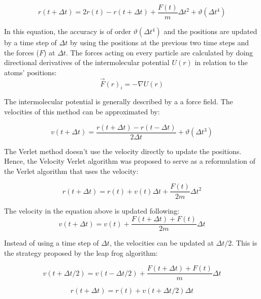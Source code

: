 \begin{equation}
r(t+ \Delta t) = 2r(t) - r(t+ \Delta t) + \frac{F(t)}{m} \Delta t^{2} +\vartheta (\Delta t^{4})
\end{equation}

In this equation, the accuracy is of order $\vartheta (\Delta t^{4})$ and the positions are updated by a time step of $\Delta t$ by using the positions at the previous two time steps and the forces ($F$) at $\Delta t$. The forces  acting on every particle are calculated by doing directional derivatives of the intermolecular potential $U(r)$ in relation to the atoms' positions:
\begin{equation}
\label{eq:forces}
\vec{F }(r)_{i} =  - \nabla U(r)
\end{equation}

The intermolecular potential is generally described by a a force field. The velocities of this method can be approximated by:

\begin{equation}
v(t+ \Delta t) = \frac{r(t+ \Delta t) - r(t- \Delta t)}{2 \Delta t} +\vartheta (\Delta t^{3})
\end{equation}

The Verlet method doesn't use the velocity directly to update the positions. Hence, the Velocity Verlet algorithm was proposed to serve as a reformulation of the Verlet algorithm that uses the velocity: 

\begin{equation}
r(t+ \Delta t) = r(t) +v(t) \Delta t + \frac{F(t)}{2m} \Delta t^{2}
\end{equation}

The velocity in the equation above is updated following:
\begin{equation}
v(t+ \Delta t) = v(t) +\frac{F(t+ \Delta t) +F(t)}{2m} \Delta t
\end{equation}

Instead of using a time step of $\Delta t$, the velocities can be updated at $\Delta t /2$. This is the strategy proposed by the leap frog algorithm:

\begin{equation}
v(t+ \Delta t /2) = v(t- \Delta t /2) +\frac{F(t+ \Delta t) +F(t)}{m} \Delta t
\end{equation}

\begin{equation}
r(t+ \Delta t) = r(t) +v(t+ \Delta t /2) \Delta t
\end{equation}

